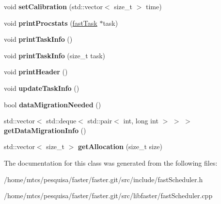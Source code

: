 \begin{DoxyCompactItemize}
\item 
\hypertarget{classfaster_1_1fastScheduler_a4d2aec030cd131b05c7091921545b3a4}{}void {\bfseries set\+Calibration} (std\+::vector$<$ size\+\_\+t $>$ time)\label{classfaster_1_1fastScheduler_a4d2aec030cd131b05c7091921545b3a4}

\item 
\hypertarget{classfaster_1_1fastScheduler_a17a44cb80cf026772647d5226ed56fcb}{}void {\bfseries print\+Procstats} (\hyperlink{classfaster_1_1fastTask}{fast\+Task} $\ast$task)\label{classfaster_1_1fastScheduler_a17a44cb80cf026772647d5226ed56fcb}

\item 
\hypertarget{classfaster_1_1fastScheduler_a426b97359b035f696ea99b0ce65ed781}{}void {\bfseries print\+Task\+Info} ()\label{classfaster_1_1fastScheduler_a426b97359b035f696ea99b0ce65ed781}

\item 
\hypertarget{classfaster_1_1fastScheduler_a93a5bb37ea8bc6a8d601dd01a2ed736b}{}void {\bfseries print\+Task\+Info} (size\+\_\+t task)\label{classfaster_1_1fastScheduler_a93a5bb37ea8bc6a8d601dd01a2ed736b}

\item 
\hypertarget{classfaster_1_1fastScheduler_a6c4b825db8c979eafead42e321e95d05}{}void {\bfseries print\+Header} ()\label{classfaster_1_1fastScheduler_a6c4b825db8c979eafead42e321e95d05}

\item 
\hypertarget{classfaster_1_1fastScheduler_a0c91feaec23646ee84e1fa530fe7cccf}{}void {\bfseries update\+Task\+Info} ()\label{classfaster_1_1fastScheduler_a0c91feaec23646ee84e1fa530fe7cccf}

\item 
\hypertarget{classfaster_1_1fastScheduler_a650ace70f7cb64835674cd67a5f605ca}{}bool {\bfseries data\+Migration\+Needed} ()\label{classfaster_1_1fastScheduler_a650ace70f7cb64835674cd67a5f605ca}

\item 
\hypertarget{classfaster_1_1fastScheduler_a181ea8d42d461ffd16785f77b4d6b416}{}std\+::vector$<$ std\+::deque$<$ std\+::pair$<$ int, long int $>$ $>$ $>$ {\bfseries get\+Data\+Migration\+Info} ()\label{classfaster_1_1fastScheduler_a181ea8d42d461ffd16785f77b4d6b416}

\item 
\hypertarget{classfaster_1_1fastScheduler_a47394267a9a85f9747a483a43cf6a650}{}std\+::vector$<$ size\+\_\+t $>$ {\bfseries get\+Allocation} (size\+\_\+t size)\label{classfaster_1_1fastScheduler_a47394267a9a85f9747a483a43cf6a650}

\end{DoxyCompactItemize}


The documentation for this class was generated from the following files\+:\begin{DoxyCompactItemize}
\item 
/home/mtcs/pesquisa/faster/faster.\+git/src/include/fast\+Scheduler.\+h\item 
/home/mtcs/pesquisa/faster/faster.\+git/src/libfaster/fast\+Scheduler.\+cpp\end{DoxyCompactItemize}

